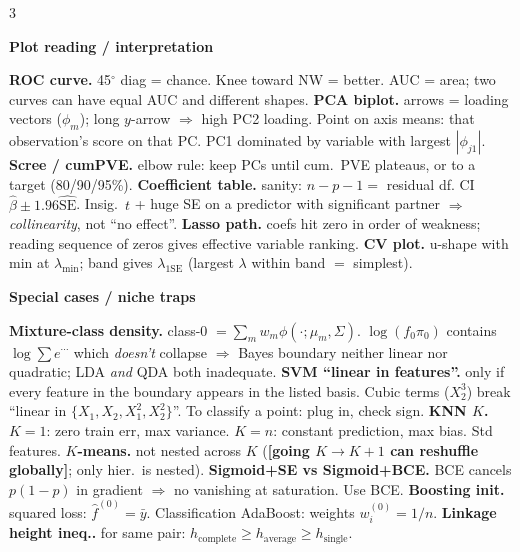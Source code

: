\documentclass[a4paper,8pt]{extarticle}
\renewcommand{\section}[1]{\par\vspace{2pt}\noindent\colorbox{black!15}{\parbox{0.97\linewidth}{\strut\bfseries\small #1}}\par\vspace{1pt}}
\newcommand{\hd}[1]{\textbf{#1.}}
\newcommand{\tr}[1]{\textcolor{red!70!black}{\textbf{[#1]}}} %
\begin{document}
\begin{multicols*}{3}
\section{Plot reading / interpretation}
\hd{ROC curve} 45$^\circ$ diag = chance. Knee toward NW = better. AUC = area; two curves can have equal AUC and different shapes.
\hd{PCA biplot} arrows = loading vectors ($\phi_m$); long $y$-arrow $\Rightarrow$ high PC2 loading. Point on axis means: that observation's score on that PC. PC1 dominated by variable with largest $|\phi_{j1}|$.
\hd{Scree / cumPVE} elbow rule: keep PCs until cum.\ PVE plateaus, or to a target (80/90/95\%).
\hd{Coefficient table} sanity: $n-p-1=$ residual df. CI $\hat\beta\pm1.96\widehat{\text{SE}}$. Insig.\ $t$ + huge SE on a predictor with significant partner $\Rightarrow$ \emph{collinearity}, not ``no effect''.
\hd{Lasso path} coefs hit zero in order of weakness; reading sequence of zeros gives effective variable ranking.
\hd{CV plot} u-shape with min at $\lambda_{\min}$; band gives $\lambda_{1\text{SE}}$ (largest $\lambda$ within band $=$ simplest).

\section{Special cases / niche traps}
\hd{Mixture-class density} class-0 $=\sum_m w_m\phi(\cdot;\mu_m,\Sigma)$. $\log(f_0\pi_0)$ contains $\log\sum e^{\cdots}$ which \emph{doesn't} collapse $\Rightarrow$ Bayes boundary neither linear nor quadratic; LDA \emph{and} QDA both inadequate.
\hd{SVM ``linear in features''} only if every feature in the boundary appears in the listed basis. Cubic terms ($X_2^3$) break ``linear in $\{X_1,X_2,X_1^2,X_2^2\}$''. To classify a point: plug in, check sign.
\hd{KNN $K$} $K=1$: zero train err, max variance. $K=n$: constant prediction, max bias. Std features.
\hd{$K$-means} not nested across $K$ (\tr{going $K{\to}K{+}1$ can reshuffle globally}; only hier.\ is nested).
\hd{Sigmoid+SE vs Sigmoid+BCE} BCE cancels $p(1-p)$ in gradient $\Rightarrow$ no vanishing at saturation. Use BCE.
\hd{Boosting init} squared loss: $\hat f^{(0)}=\bar y$. Classification AdaBoost: weights $w_i^{(0)}=1/n$.
\hd{Linkage height ineq.} for same pair: $h_{\text{complete}}\ge h_{\text{average}}\ge h_{\text{single}}$.


\end{multicols*}
\end{document}
